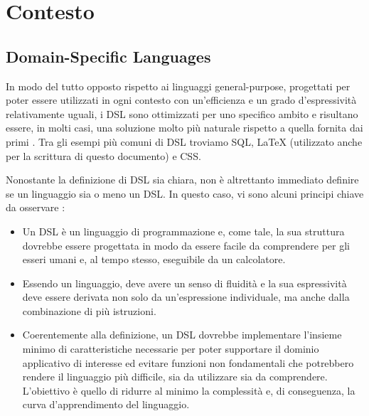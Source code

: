 \documentclass[12pt,a4paper,openright,twoside]{book}
\begin{document}
\chapter{Contesto}
\label{chap:contesto}

\section{Domain-Specific Languages}
In modo del tutto opposto rispetto ai linguaggi general-purpose, progettati per poter essere utilizzati in ogni contesto con un’efficienza e 
un grado d’espressività relativamente uguali, i \ac{DSL} sono ottimizzati per uno specifico ambito e risultano essere, in molti casi, una 
soluzione molto più naturale rispetto a quella fornita dai primi \cite{Hudak1997}. Tra gli esempi più comuni di \ac{DSL} troviamo SQL, LaTeX 
(utilizzato anche per la scrittura di questo documento) e CSS.

Nonostante la definizione di \ac{DSL} sia chiara, non è altrettanto immediato definire se un linguaggio sia o meno un \ac{DSL}. In questo caso, 
vi sono alcuni principi chiave da osservare \cite{Fowler2010}:
\begin{itemize}
    \item Un \ac{DSL} è un linguaggio di programmazione e, come tale, la sua struttura dovrebbe essere progettata in modo da essere facile da 
    comprendere per gli esseri umani e, al tempo stesso, eseguibile da un calcolatore.
    \item Essendo un linguaggio, deve avere un senso di fluidità e la sua espressività deve essere derivata non solo da un’espressione 
    individuale, ma anche dalla combinazione di più istruzioni.
    \item Coerentemente alla definizione, un \ac{DSL} dovrebbe implementare l'insieme minimo di caratteristiche necessarie per poter supportare 
    il dominio applicativo di interesse ed evitare funzioni non fondamentali che potrebbero rendere il linguaggio più difficile, 
    sia da utilizzare sia da comprendere. L'obiettivo è quello di ridurre al minimo la complessità e, di conseguenza, la curva d'apprendimento 
    del linguaggio.
\end{itemize}
\end{document}
